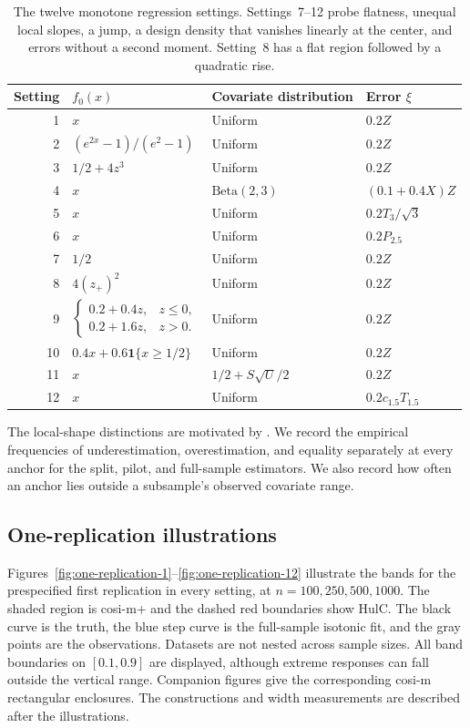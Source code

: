 \documentclass[10pt]{article}
\begin{document}
\begin{table}[htbp]
\centering
\small
\setlength{\tabcolsep}{4pt}
\begin{tabular}{@{}r p{.31\linewidth} p{.22\linewidth} p{.32\linewidth}@{}}
\toprule
Setting & $f_0(x)$ & Covariate distribution & Error $\xi$ \\
\midrule
1 & $x$ & Uniform & $0.2Z$ \\
2 & $(e^{2x}-1)/(e^2-1)$ & Uniform & $0.2Z$ \\
3 & $1/2+4z^3$ & Uniform & $0.2Z$ \\
4 & $x$ & $\mathrm{Beta}(2,3)$ & $(0.1+0.4X)Z$ \\
5 & $x$ & Uniform & $0.2T_3/\sqrt3$ \\
6 & $x$ & Uniform & $0.2P_{2.5}$ \\
7 & $1/2$ & Uniform & $0.2Z$ \\
8 & $4(z_+)^2$ & Uniform & $0.2Z$ \\
9 & $\begin{cases}0.2+0.4z,&z\le0,\\0.2+1.6z,&z>0.\end{cases}$ & Uniform & $0.2Z$ \\
10 & $0.4x+0.6\mathbf1\{x\ge1/2\}$ & Uniform & $0.2Z$ \\
11 & $x$ & $1/2+S\sqrt U/2$ & $0.2Z$ \\
12 & $x$ & Uniform & $0.2c_{1.5}T_{1.5}$ \\
\bottomrule
\end{tabular}
\caption{The twelve monotone regression settings. Settings~7--12 probe flatness, unequal local slopes, a jump, a design density that vanishes linearly at the center, and errors without a second moment. Setting~8 has a flat region followed by a quadratic rise.}
\label{tab:isotonic-dgp}
\end{table}

The local-shape distinctions are motivated by \cite[Section~2.3, especially Example~2.3; Section~3.2; Appendix~A]{mallick2026generalized}. We record the empirical frequencies of underestimation, overestimation, and equality separately at every anchor for the split, pilot, and full-sample estimators. We also record how often an anchor lies outside a subsample's observed covariate range.

\subsection{One-replication illustrations}
Figures~\ref{fig:one-replication-1}--\ref{fig:one-replication-12} illustrate the
bands for the prespecified first replication in every setting, at
$n=100,250,500,1000$. The shaded region is cosi-m+ and the dashed red
boundaries show HulC. The black curve is the truth, the blue step curve is
the full-sample isotonic fit, and the gray points are the observations.
Datasets are not nested across sample sizes. All band boundaries on
$[0.1,0.9]$ are displayed, although extreme responses can fall outside
the vertical range. Companion figures give the corresponding cosi-m
rectangular enclosures. The constructions and width measurements are
described after the illustrations.
\end{document}
